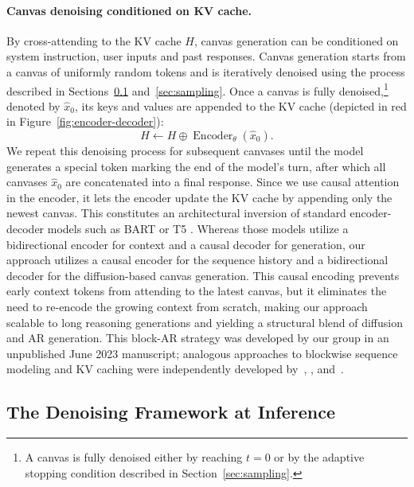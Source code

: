 \documentclass[11pt, a4paper, logo, copyright, gdm]{google}
\newcommand{\enc}{\operatorname{Encoder}_{\theta}}
\begin{document}
\paragraph{Canvas denoising conditioned on KV cache.} By cross-attending to the KV cache $H$, canvas generation can be conditioned on system instruction, user inputs and past responses. Canvas generation starts from a canvas of uniformly random tokens and is iteratively denoised using the process described in Sections~\ref{sec:denoising} and~\ref{sec:sampling}. Once a canvas is fully denoised,\footnote{A canvas is fully denoised either by reaching $t=0$ or by the adaptive stopping condition described in Section~\ref{sec:sampling}.} denoted by $\hat{x}_0$, its keys and values are appended to the KV cache (depicted in red in Figure~\ref{fig:encoder-decoder}):
\begin{equation}
    \label{eq:updated_kv_cache}
    H \gets H \oplus \enc(\hat{x}_0).
\end{equation}
We repeat this denoising process for subsequent canvases until the model generates a special token marking the end of the model's turn, after which all canvases $\hat{x}_0$ are concatenated into a final response. Since we use causal attention in the encoder, it lets the encoder update the KV cache by appending only the newest canvas. This constitutes an architectural inversion of standard encoder-decoder models such as BART \citep{lewis2020bart} or T5 \citep{raffel2020exploring}. Whereas those models utilize a bidirectional encoder for context and a causal decoder for generation, our approach utilizes a causal encoder for the sequence history and a bidirectional decoder for the diffusion-based canvas generation. This causal encoding prevents early context tokens from attending to the latest canvas, but it eliminates the need to re-encode the growing context from scratch, making our approach scalable to long reasoning generations and yielding a structural blend of diffusion and AR generation. This block-AR strategy was developed by our group in an unpublished June 2023 manuscript; analogous approaches to blockwise sequence modeling and KV caching were independently developed by~\citet{wu2025fastdllmv2}, \citet{arriola2025block}, and~\citet{deschenaux2026blockgen}.


\subsection{The Denoising Framework at Inference}\label{sec:denoising}
\end{document}
